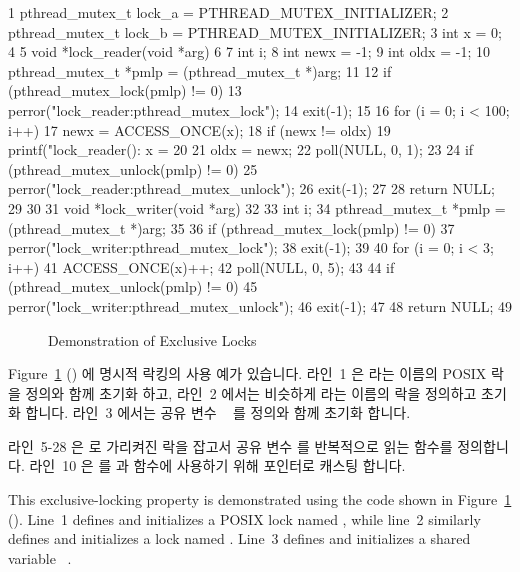 { \scriptsize
\begin{verbbox}
  1 pthread_mutex_t lock_a = PTHREAD_MUTEX_INITIALIZER;
  2 pthread_mutex_t lock_b = PTHREAD_MUTEX_INITIALIZER;
  3 int x = 0;
  4 
  5 void *lock_reader(void *arg)
  6 {
  7   int i;
  8   int newx = -1;
  9   int oldx = -1;
 10   pthread_mutex_t *pmlp = (pthread_mutex_t *)arg;
 11 
 12   if (pthread_mutex_lock(pmlp) != 0) {
 13     perror("lock_reader:pthread_mutex_lock");
 14     exit(-1);
 15   }
 16   for (i = 0; i < 100; i++) {
 17     newx = ACCESS_ONCE(x);
 18     if (newx != oldx) {
 19       printf("lock_reader(): x = %
 20     }
 21     oldx = newx;
 22     poll(NULL, 0, 1);
 23   }
 24   if (pthread_mutex_unlock(pmlp) != 0) {
 25     perror("lock_reader:pthread_mutex_unlock");
 26     exit(-1);
 27   }
 28   return NULL;
 29 }
 30 
 31 void *lock_writer(void *arg)
 32 {
 33   int i;
 34   pthread_mutex_t *pmlp = (pthread_mutex_t *)arg;
 35 
 36   if (pthread_mutex_lock(pmlp) != 0) {
 37     perror("lock_writer:pthread_mutex_lock");
 38     exit(-1);
 39   }
 40   for (i = 0; i < 3; i++) {
 41     ACCESS_ONCE(x)++;
 42     poll(NULL, 0, 5);
 43   }
 44   if (pthread_mutex_unlock(pmlp) != 0) {
 45     perror("lock_writer:pthread_mutex_unlock");
 46     exit(-1);
 47   }
 48   return NULL;
 49 }
\end{verbbox}
}
\begin{figure}[tbp]
\centering
\theverbbox
\caption{Demonstration of Exclusive Locks}
\label{fig:toolsoftrade:Demonstration of Exclusive Locks}
\end{figure}

Figure~\ref{fig:toolsoftrade:Demonstration of Exclusive Locks}
() 에 명시적 락킹의 사용 예가 있습니다.
라인~1 은  라는 이름의 POSIX 락을 정의와 함께 초기화 하고,
라인~2 에서는 비슷하게  라는 이름의 락을 정의하고 초기화 합니다.
라인~3 에서는 공유 변수 ~ 를 정의와 함께 초기화 합니다.

라인~5-28 은  로 가리켜진 락을 잡고서 공유 변수  를 반복적으로
읽는  함수를 정의합니다.
라인~10 은  를  과 
함수에 사용하기 위해  포인터로 캐스팅 합니다.

\iffalse
This exclusive-locking property is demonstrated using the code shown in
Figure~\ref{fig:toolsoftrade:Demonstration of Exclusive Locks}
().
Line~1 defines and initializes a POSIX lock named , while
line~2 similarly defines and initializes a lock named .
Line~3 defines and initializes a shared variable ~.

